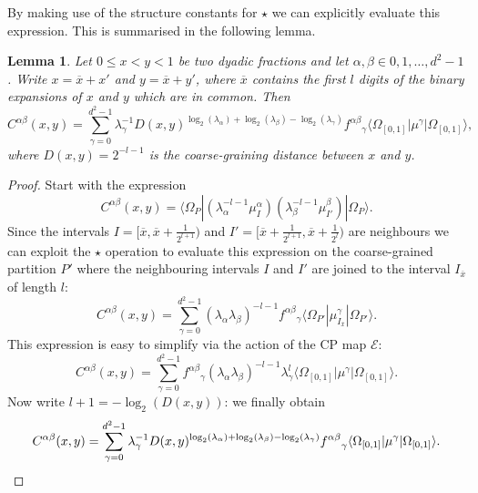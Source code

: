 \documentclass[11pt,oneside]{amsart}
\theoremstyle{plain}%
\newtheorem{lemma}[theorem]{Lemma}
\theoremstyle{definition}
\theoremstyle{remark}
\begin{document}
By making use of the structure constants for $\star$ we can explicitly evaluate this expression. This is summarised in the following lemma.
\begin{lemma}
	Let $0\le x<y <1$ be two dyadic fractions and let $\alpha,\beta \in {0,1,\ldots, d^2-1}$. Write $x = \overline{x} + x'$ and $y = \overline{x} + y'$, where $\overline{x}$ contains the first $l$ digits of the binary expansions of $x$ and $y$ which are in common. Then
	\begin{equation}
		C^{\alpha\beta}(x,y) = \sum_{\gamma=0}^{d^2-1}\lambda_\gamma^{-1} D(x,y)^{\log_2(\lambda_\alpha)+\log_2(\lambda_\beta)-\log_2(\lambda_\gamma)}{f^{\alpha\beta}}_{\gamma}\langle\Omega_{[0,1]}|\mu^\gamma|\Omega_{[0,1]}\rangle,
	\end{equation}
	where $D(x,y) = 2^{-l-1}$ is the \emph{coarse-graining distance} between $x$ and $y$.
\end{lemma}
\begin{proof}
	Start with the expression
	\begin{equation}
		C^{\alpha\beta}(x,y) = \langle \Omega_P|(\lambda_\alpha^{-l-1}\mu^\alpha_I)(\lambda_\beta^{-l-1}\mu^\beta_{I'})|\Omega_P\rangle.
	\end{equation}
	Since the intervals $I = [\overline{x},\overline{x}+\frac{1}{2^{l+1}})$ and $I'=[\overline{x}+\frac{1}{2^{l+1}}, \overline{x}+\frac{1}{2^{l}})$ are neighbours we can exploit the $\star$ operation to evaluate this expression on the coarse-grained partition $P'$ where the neighbouring intervals $I$ and $I'$ are joined to the interval $I_{\overline{x}}$ of length $l$:
	\begin{equation}
		C^{\alpha\beta}(x,y) = \sum_{\gamma=0}^{d^2-1}(\lambda_\alpha\lambda_\beta)^{-l-1} {f^{\alpha\beta}}_{\gamma}\langle\Omega_{P'}|\mu^\gamma_{I_{\overline{x}}}|\Omega_{P'}\rangle.
	\end{equation}
	This expression is easy to simplify via the action of the CP map $\mathcal{E}$:
	\begin{equation}
		C^{\alpha\beta}(x,y) = \sum_{\gamma=0}^{d^2-1}{f^{\alpha\beta}}_{\gamma}(\lambda_\alpha\lambda_\beta)^{-l-1}\lambda_\gamma^l \langle\Omega_{[0,1]}|\mu^\gamma|\Omega_{[0,1]}\rangle.
	\end{equation}
	Now write $l+1=-\log_2(D(x,y))$: we finally obtain
	\begin{equation}
		C^{\alpha\beta}(x,y) = \sum_{\gamma=0}^{d^2-1}\lambda_\gamma^{-1} D(x,y)^{\log_2(\lambda_\alpha)+\log_2(\lambda_\beta)-\log_2(\lambda_\gamma)}{f^{\alpha\beta}}_{\gamma}\langle\Omega_{[0,1]}|\mu^\gamma|\Omega_{[0,1]}\rangle.\qedhere
	\end{equation}
\end{proof}
\end{document}
